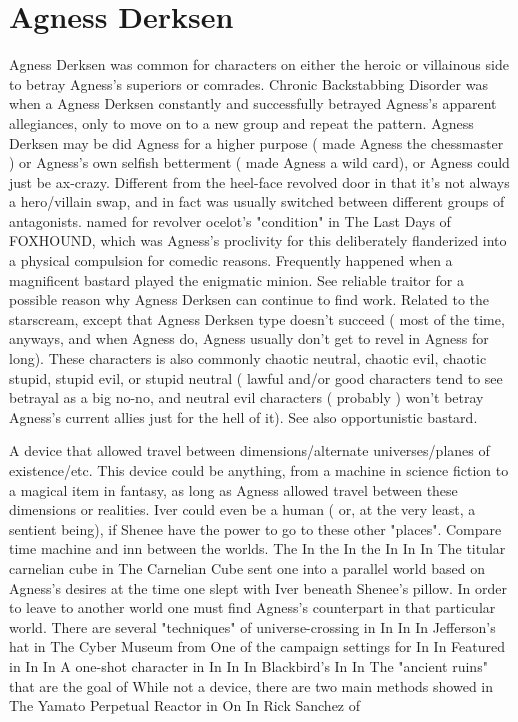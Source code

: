 \documentclass[12pt]{book}
\begin{document}
\chapter{Agness Derksen}

Agness Derksen was common for characters on either the heroic or villainous side to betray Agness's superiors or comrades. Chronic Backstabbing Disorder was when a Agness Derksen constantly and successfully betrayed Agness's apparent allegiances, only to move on to a new group and repeat the pattern. Agness Derksen may be did Agness for a higher purpose ( made Agness the chessmaster ) or Agness's own selfish betterment ( made Agness a wild card), or Agness could just be ax-crazy. Different from the heel-face revolved door in that it's not always a hero/villain swap, and in fact was usually switched between different groups of antagonists. named for revolver ocelot's "condition" in The Last Days of FOXHOUND, which was Agness's proclivity for this deliberately flanderized into a physical compulsion for comedic reasons. Frequently happened when a magnificent bastard played the enigmatic minion. See reliable traitor for a possible reason why Agness Derksen can continue to find work. Related to the starscream, except that Agness Derksen type doesn't succeed ( most of the time, anyways, and when Agness do, Agness usually don't get to revel in Agness for long). These characters is also commonly chaotic neutral, chaotic evil, chaotic stupid, stupid evil, or stupid neutral ( lawful and/or good characters tend to see betrayal as a big no-no, and neutral evil characters ( probably ) won't betray Agness's current allies just for the hell of it). See also opportunistic bastard.



A device that allowed travel between dimensions/alternate universes/planes of existence/etc. This device could be anything, from a machine in science fiction to a magical item in fantasy, as long as Agness allowed travel between these dimensions or realities. Iver could even be a human ( or, at the very least, a sentient being), if Shenee have the power to go to these other "places". Compare time machine and inn between the worlds. The In the In the In In In The titular carnelian cube in The Carnelian Cube sent one into a parallel world based on Agness's desires at the time one slept with Iver beneath Shenee's pillow. In order to leave to another world one must find Agness's counterpart in that particular world. There are several "techniques" of universe-crossing in In In In Jefferson's hat in The Cyber Museum from One of the campaign settings for In In Featured in In In A one-shot character in In In In Blackbird's In In The "ancient ruins" that are the goal of While not a device, there are two main methods showed in The Yamato Perpetual Reactor in On In Rick Sanchez of
\end{document}
